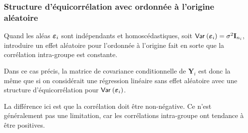 \documentclass{beamer}
\begin{document}
\begin{frame}[fragile]
\frametitle{Structure d'équicorrélation avec ordonnée à l'origine aléatoire}
\bi \item Quand les aléas $\boldsymbol {\varepsilon}_i$ sont indépendants et homoscédastiques, soit ${\mathsf{Var}_{}}\left(\boldsymbol {\varepsilon}_i\right)=\sigma^2\mathbf{I}_{n_i}$, introduire un effet aléatoire pour l'ordonnée à l'origine fait en sorte que la corrélation intra-groupe est constante.
\item 
Dans ce cas précis, la matrice de covariance conditionnelle de  $\boldsymbol{Y}_i$ est donc la même que si
on considérait une régression linéaire sans effet aléatoire avec une structure d'équicorrélation pour  ${\mathsf{Var}_{}}\left(\boldsymbol {\varepsilon}_i\right)$.
\item 
La différence ici est que la corrélation doit être non-négative. Ce n'est généralement pas une limitation, car les corrélations intra-groupe ont tendance à être positives.
\ei
\end{frame}
% 
\end{document}
